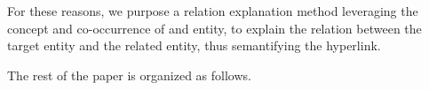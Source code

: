 


For these reasons, we purpose a relation explanation method leveraging the concept and co-occurrence of and entity, to explain the relation between the target entity and the related entity, thus semantifying the hyperlink.

The rest of the paper is organized as follows.

%
